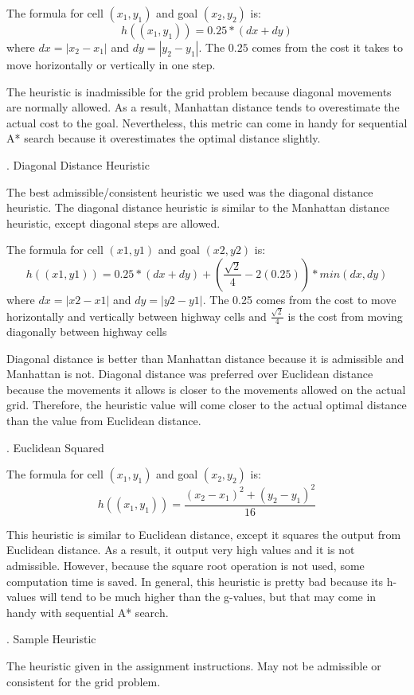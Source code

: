 \documentclass[12pt, letterpaper]{article}
\begin{document}
The formula for cell $(x_1, y_1)$ and goal $(x_2, y_2)$ is:
$$h((x_1, y_1)) = 0.25 * (dx + dy)$$
where $dx = |x_2 - x_1|$ and $dy = |y_2 - y_1|$. The $0.25$ comes from the cost it takes to move horizontally or vertically in one step.

The heuristic is inadmissible for the grid problem because diagonal movements are normally allowed. As a result, Manhattan distance tends to overestimate the actual cost to the goal. Nevertheless, this metric can come in handy for sequential A* search because it overestimates the optimal distance slightly.

\bigskip
{}. Diagonal Distance Heuristic

The best admissible/consistent heuristic we used was the diagonal distance heuristic. The diagonal distance heuristic is similar to the Manhattan distance heuristic, except diagonal steps are allowed. 

The formula for cell $(x1,y1)$ and goal $(x2, y2)$ is:
$$h((x1, y1)) = 0.25 * (dx + dy) +  (\frac{\sqrt{2}}{4} - 2(0.25)) * min(dx, dy)$$
where $dx = |x2 - x1|$ and $dy = |y2 - y1|$. The 0.25 comes from the cost to move horizontally and vertically between highway cells and $\frac{\sqrt{2}}{4}$ is the cost from moving diagonally between highway cells

Diagonal distance is better than Manhattan distance because it is admissible and Manhattan is not. Diagonal distance was preferred over Euclidean distance because the movements it allows is closer to the movements allowed on the actual grid. Therefore, the heuristic value will come closer to the actual optimal distance than the value from Euclidean distance.

\bigskip
{}. Euclidean Squared

The formula for cell $(x_1, y_1)$ and goal $(x_2, y_2)$ is:
$$h((x_1,y_1)) = \frac{(x_2-x_1)^2 + (y_2-y_1)^2}{16}$$

This heuristic is similar to Euclidean distance, except it squares the output from Euclidean distance. As a result, it output very high values and it is not admissible. However, because the square root operation is not used, some computation time is saved. In general, this heuristic is pretty bad because its h-values will tend to be much higher than the g-values, but that may come in handy with sequential A* search.

\bigskip
{}. Sample Heuristic

The heuristic given in the assignment instructions. May not be admissible or consistent for the grid problem. 
\end{document}
